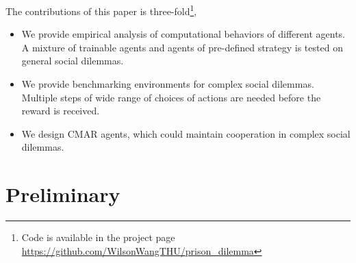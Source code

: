 \documentclass{article}
\begin{document}
The contributions of this paper is three-fold\footnote{Code is available in the project page \url{https://github.com/WilsonWangTHU/prison_dilemma}}, 
\begin{itemize}
\item We provide empirical analysis of computational behaviors of different agents.
A mixture of trainable agents and agents of pre-defined strategy is tested on general social dilemmas.
\item We provide benchmarking environments for complex social dilemmas.
Multiple steps of wide range of choices of actions are needed before the reward is received.
\item We design CMAR agents, which could maintain cooperation in complex social dilemmas.
\end{itemize}
% 
\section{Preliminary}
\end{document}
